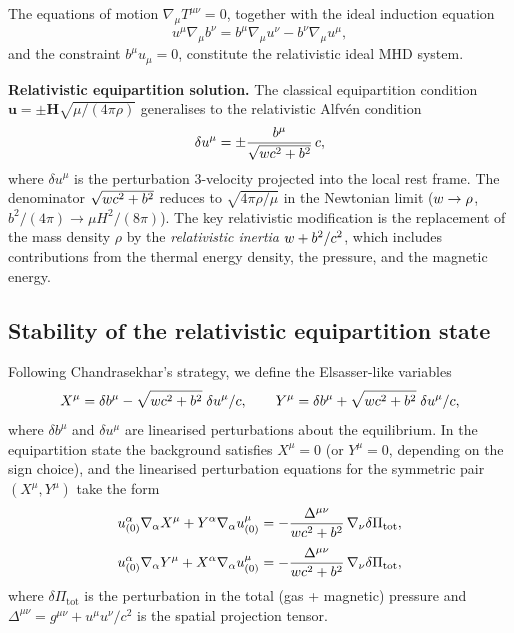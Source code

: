 The equations of motion $\nabla_{\mu}T^{\mu\nu} = 0$, together with
the ideal induction equation
\begin{equation}
\label{eq:rel-113-induction}
u^{\mu}\nabla_{\mu}b^{\nu} = b^{\mu}\nabla_{\mu}u^{\nu}
  - b^{\nu}\nabla_{\mu}u^{\mu},
\end{equation}
and the constraint $b^{\mu}u_{\mu} = 0$, constitute the relativistic
ideal MHD system.

\begin{relcorrection}
\textbf{Relativistic equipartition solution.}
The classical equipartition condition $\mathbf{u} = \pm\mathbf{H}
\sqrt{\mu/(4\pi\rho)}$ generalises to the relativistic Alfv\'en
condition
\begin{equation}
\label{eq:rel-113-equip}
\delta u^{\mu} = \pm \frac{b^{\mu}}{\sqrt{w c^{2} + b^{2}}}\,c,
\end{equation}
where $\delta u^{\mu}$ is the perturbation 3-velocity projected into
the local rest frame.  The denominator
$\sqrt{w c^{2} + b^{2}}$ reduces to $\sqrt{4\pi\rho/\mu}$ in
the Newtonian limit ($w \to \rho$, $b^{2}/(4\pi) \to
\mu H^{2}/(8\pi)$).  The key relativistic modification is the
replacement of the mass density $\rho$ by the \emph{relativistic
inertia} $w + b^{2}/c^{2}$, which includes contributions from
the thermal energy density, the pressure, and the magnetic energy.
\end{relcorrection}

\subsection{Stability of the relativistic equipartition state}
\label{sec:rel-113-stab}

Following Chandrasekhar's strategy, we define the Elsasser-like
variables
\begin{equation}
\label{eq:rel-113-XY}
X^{\mu} = \delta b^{\mu} - \sqrt{w c^{2}+b^{2}}\;\delta u^{\mu}/c,
\qquad
Y^{\mu} = \delta b^{\mu} + \sqrt{w c^{2}+b^{2}}\;\delta u^{\mu}/c,
\end{equation}
where $\delta b^{\mu}$ and $\delta u^{\mu}$ are linearised
perturbations about the equilibrium.  In the equipartition state the
background satisfies $X^{\mu} = 0$ (or $Y^{\mu} = 0$, depending on
the sign choice), and the linearised perturbation equations for the
symmetric pair $(X^{\mu}, Y^{\mu})$ take the form
\begin{equation}
\label{eq:rel-113-Xeq}
u^{\alpha}_{(0)}\nabla_{\alpha}X^{\mu}
  + Y^{\alpha}\nabla_{\alpha}u^{\mu}_{(0)}
  = -\frac{\Delta^{\mu\nu}}{w c^{2}+b^{2}}\,\nabla_{\nu}\delta\Pi_{\mathrm{tot}},
\end{equation}
\begin{equation}
\label{eq:rel-113-Yeq}
u^{\alpha}_{(0)}\nabla_{\alpha}Y^{\mu}
  + X^{\alpha}\nabla_{\alpha}u^{\mu}_{(0)}
  = -\frac{\Delta^{\mu\nu}}{w c^{2}+b^{2}}\,\nabla_{\nu}\delta\Pi_{\mathrm{tot}},
\end{equation}
where $\delta\Pi_{\mathrm{tot}}$ is the perturbation in the total
(gas + magnetic) pressure and $\Delta^{\mu\nu} = g^{\mu\nu} +
u^{\mu}u^{\nu}/c^{2}$ is the spatial projection tensor.

